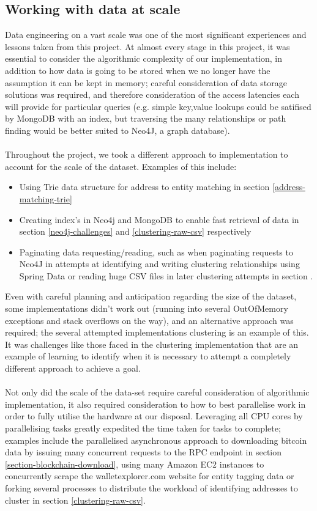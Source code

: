 \subsection{Working with data at scale}
Data engineering on a vast scale was one of the most significant experiences and lessons taken from this project. At almost every stage in this project, it was essential to consider the algorithmic complexity of our implementation, in addition to how data is going to be stored when we no longer have the assumption it can be kept in memory; careful consideration of data storage solutions was required, and therefore consideration of the access latencies each will provide for particular queries (e.g. simple key,value lookups could be satifised by MongoDB with an index, but traversing the many relationships or path finding would be better suited to Neo4J, a graph database). 
\\\\
Throughout the project, we took a different approach to implementation to account for the scale of the dataset. Examples of this include:
\begin{itemize}
    \item Using Trie data structure for address to entity matching in section \ref{address-matching-trie}
    \item Creating index's in Neo4j and MongoDB to enable fast retrieval of data in section \ref{neo4j-challenges} and \ref{clustering-raw-csv} respectively
    \item Paginating data requesting/reading, such as when paginating requests to Neo4J in attempts at identifying and writing clustering relationships using Spring Data or reading huge CSV files in later clustering attempts in section \label{section-clustering}. 
\end{itemize}

Even with careful planning and anticipation regarding the size of the dataset, some implementations didn't work out (running into several OutOfMemory exceptions and stack overflows on the way), and an alternative approach was required; the several attempted implementations clustering is an example of this. It was challenges like those faced in the clustering implementation that are an example of learning to identify when it is necessary to attempt a completely different approach to achieve a goal. 
\\\\
Not only did the scale of the data-set require careful consideration of algorithmic implementation, it also required consideration to how to best parallelise work in order to fully utilise the hardware at our disposal. 
Leveraging all CPU cores by parallelising tasks greatly expedited the time taken for tasks to complete; examples include the parallelised asynchronous approach to downloading bitcoin data by issuing many concurrent requests to the RPC endpoint in section \ref{section-blockchain-download}, using many Amazon EC2 instances to concurrently scrape the walletexplorer.com website for entity tagging data or forking several processes to distribute the workload of identifying addresses to cluster in section \ref{clustering-raw-csv}.


